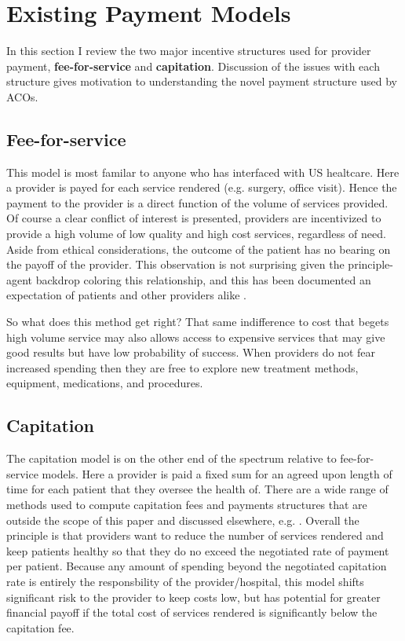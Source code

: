 \documentclass{article}
\begin{document}
\section*{Existing Payment Models}
In this section I review the two major incentive structures used for provider payment, \textbf{fee-for-service} and \textbf{capitation}. Discussion of the issues with each structure gives motivation to understanding the novel payment structure used by ACOs.

\subsection*{Fee-for-service}
This model is most familar to anyone who has interfaced with US healtcare. Here a provider is payed for each service rendered (e.g. surgery, office visit). Hence the payment to the provider is a direct function of the volume of services provided. Of course a clear conflict of interest is presented, providers are incentivized to provide a high volume of low quality and high cost services, regardless of need. Aside from ethical considerations, the outcome of the patient has no bearing on the payoff of the provider. This observation is not surprising given the principle-agent backdrop coloring this relationship, and this has been documented an expectation of patients and other providers alike \cite{econharvard}\cite{overtreat}.

So what does this method get right? That same indifference to cost that begets high volume service may also allows access to expensive services that may give good results but have low probability of success. When providers do not fear increased spending then they are free to explore new treatment methods, equipment, medications, and procedures.

\subsection*{Capitation}
The capitation model is on the other end of the spectrum relative to fee-for-service models. Here a provider is paid a fixed sum for an agreed upon length of time for each patient that they oversee the health of. There are a wide range of methods used to compute capitation fees and payments structures that are outside the scope of this paper and discussed elsewhere, e.g. \cite{capfees}. Overall the principle is that providers want to reduce the number of services rendered and keep patients healthy so that they do no exceed the negotiated rate of payment per patient. Because any amount of spending beyond the negotiated capitation rate is entirely the responsbility of the provider/hospital, this model shifts significant risk to the provider to keep costs low, but has potential for greater financial payoff if the total cost of services rendered is significantly below the capitation fee.
\end{document}
